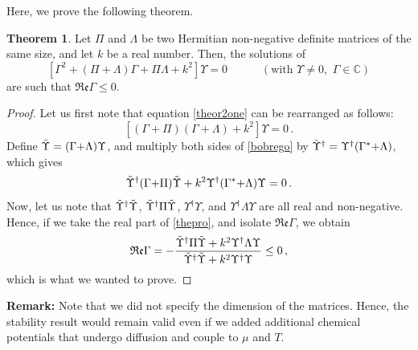 \documentclass[a4paper, amsfonts, amssymb, amsmath, reprint, showkeys, nofootinbib, twoside,notitlepage]{revtex4-1}
\newcommand{\spc}{\quad \quad \quad}
\theoremstyle{definition}
\theoremstyle{theorem}
\newtheorem{theorem}{Theorem}
\begin{document}
Here, we prove the following theorem.
\begin{theorem}
Let $\Pi$ and $\Lambda$ be two Hermitian non-negative definite matrices of the same size, and let $k$ be a real number. Then, the solutions of
\begin{equation}\label{theor2one}
[\Gamma^2+(\Pi{+}\Lambda) \Gamma +\Pi \Lambda+k^2]\Upsilon =0 \spc (\text{with } \Upsilon\neq 0, \, \, \Gamma\in \mathbb{C})
\end{equation}
are such that $\mathfrak{Re}\Gamma\leq 0$.
\end{theorem}
\begin{proof}
Let us first note that equation \eqref{theor2one} can be rearranged as follows:
\begin{equation}\label{bobrego}
[(\Gamma {+}\Pi)(\Gamma {+}\Lambda)+k^2]\Upsilon =0\, .
\end{equation}
Define $\Tilde{\Upsilon}=(\Gamma{+}\Lambda)\Upsilon$, and multiply both sides of \eqref{bobrego} by $\Tilde{\Upsilon}^\dagger=\Upsilon^\dagger (\Gamma^*{+}\Lambda)$, which gives
\begin{equation}\label{thepro}
\Tilde{\Upsilon}^\dagger (\Gamma {+}\Pi)\Tilde{\Upsilon}+k^2\Upsilon^\dagger (\Gamma^* {+}\Lambda)\Upsilon =0\, .   
\end{equation}
Now, let us note that $\Tilde{\Upsilon}^\dagger\Tilde{\Upsilon}$, $\Tilde{\Upsilon}^\dagger\Pi \Tilde{\Upsilon}$, $\Upsilon^\dagger \Upsilon$, and $\Upsilon^\dagger \Lambda \Upsilon$ are all real and non-negative. Hence, if we take the real part of \eqref{thepro}, and isolate $\mathfrak{Re}\Gamma$, we obtain
\begin{equation}
\mathfrak{Re}\Gamma= -\dfrac{\Tilde{\Upsilon}^\dagger \Pi\Tilde{\Upsilon}+k^2 \Upsilon^\dagger \Lambda \Upsilon}{\Tilde{\Upsilon}^\dagger\Tilde{\Upsilon}+k^2 \Upsilon^\dagger \Upsilon} \leq 0\, ,
\end{equation}
which is what we wanted to prove.
\end{proof} 

\noindent\textbf{Remark:} Note that we did not specify the dimension of the matrices. Hence, the stability result would remain valid even if we added additional chemical potentials that undergo diffusion and couple to $\mu$ and $T$.\\

\end{document}
